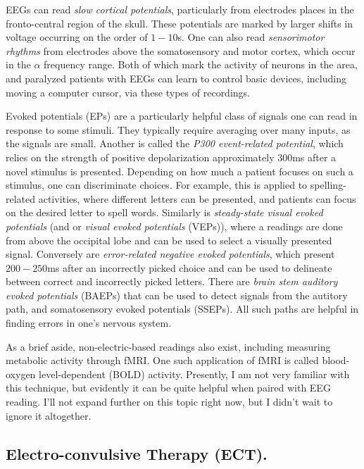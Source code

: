EEGs can read \textit{slow cortical potentials}, particularly from electrodes places in the fronto-central region of the skull. These potentials are marked by larger shifts in voltage occurring on the order of $1-10$s. One can also read \textit{sensorimotor rhythms} from electrodes above the somatosensory and motor cortex, which occur in the $\alpha$ frequency range. Both of which mark the activity of neurons in the area, and paralyzed patients with EEGs can learn to control basic devices, including moving a computer cursor, via these types of recordings. \newline

Evoked potentials (EPs) are a particularly helpful class of signals one can read in response to some stimuli. They typically require averaging over many inputs, as the signals are small. Another is called the \textit{P300 event-related potential}, which relies on the strength of positive depolarization approximately 300ms after a novel stimulus is presented. Depending on how much a patient focuses on such a stimulus, one can discriminate choices. For example, this is applied to spelling-related activities, where different letters can be presented, and patients can focus on the desired letter to spell words. Similarly is \textit{steady-state visual evoked potentials} (and or \textit{visual evoked potentials} (VEPs)), where a readings are done from above the occipital lobe and can be used to select a visually presented signal. Conversely are \textit{error-related negative evoked potentials}, which present $200-250$ms after an incorrectly picked choice and can be used to delineate between correct and incorrectly picked letters. There are \textit{brain stem auditory evoked potentials} (BAEPs) that can be used to detect signals from the autitory path, and somatosensory evoked potentials (SSEPs). All such paths are helpful in finding errors in one's nervous system.\newline

As a brief aside, non-electric-based readings also exist, including measuring metabolic activity through fMRI. One such application of fMRI is called blood-oxygen level-dependent (BOLD) activity. Presently, I am not very familiar with this technique, but evidently it can be quite helpful when paired with EEG reading. I'll not expand further on this topic right now, but I didn't wait to ignore it altogether. 

\subsection{Electro-convulsive Therapy (ECT).}

